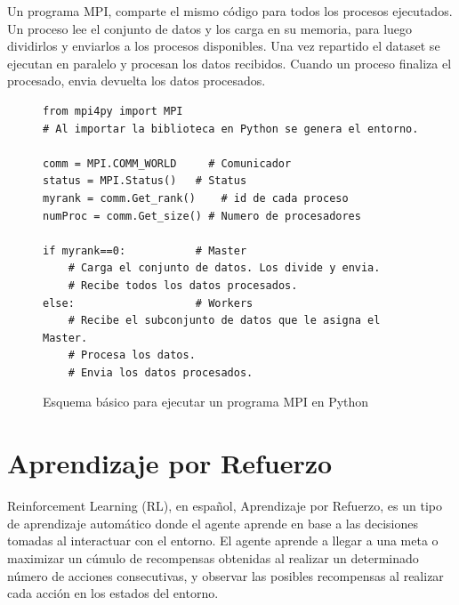 	\vspace{-0.2cm}
	
	Un programa MPI, comparte el mismo código para todos los procesos ejecutados. Un proceso lee el conjunto de datos y los carga en su memoria, para luego dividirlos y enviarlos a los procesos disponibles. Una vez repartido el dataset se ejecutan en paralelo y procesan los datos recibidos. Cuando un proceso finaliza el procesado, envia devuelta los datos procesados.
	
	\vspace{-0.1cm}

	\begin{figure}[!h]
		
		\begin{lstlisting}[frame=single]
from mpi4py import MPI 
# Al importar la biblioteca en Python se genera el entorno.

comm = MPI.COMM_WORLD     # Comunicador
status = MPI.Status()   # Status
myrank = comm.Get_rank() 	# id de cada proceso
numProc = comm.Get_size() # Numero de procesadores

if myrank==0:           # Master
    # Carga el conjunto de datos. Los divide y envia.
    # Recibe todos los datos procesados.
else:                   # Workers
    # Recibe el subconjunto de datos que le asigna el Master.
    # Procesa los datos.
    # Envia los datos procesados.
		\end{lstlisting}
		\caption{Esquema básico para ejecutar un programa MPI en Python}
		\label{fig:esquea_mpi}
	\end{figure}
	
	\newpage

\section{Aprendizaje por Refuerzo}

	Reinforcement Learning (RL), en español, Aprendizaje por Refuerzo, es un tipo de aprendizaje automático donde el agente aprende en base a las decisiones tomadas al interactuar con el entorno. El agente aprende a llegar a una meta o maximizar un cúmulo de recompensas obtenidas al realizar un determinado número de acciones consecutivas, y observar las posibles recompensas al realizar cada acción en los estados del entorno.
	

